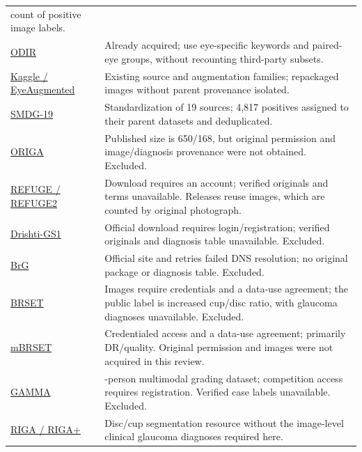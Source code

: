 \documentclass[
  10pt,
]{article}
\begin{document}
\begin{longtable}[]{@{}
  >{\raggedright\arraybackslash}p{}
  >{\raggedright\arraybackslash}p{}@{}}
count of positive image labels. \\
\href{https://www.kaggle.com/datasets/andrewmvd/ocular-disease-recognition-odir5k}{ODIR}
& Already acquired; use eye-specific keywords and paired-eye groups,
without recounting third-party subsets. \\
\href{https://github.com/yiweichen04/retina_dataset}{Kaggle /
EyeAugmented} & Existing source and augmentation families; repackaged
images without parent provenance isolated. \\
\href{https://github.com/TheBeastCoding/standardized-multichannel-dataset-glaucoma}{SMDG-19}
& Standardization of 19 sources; 4,817 positives assigned to their
parent datasets and deduplicated. \\
\href{https://www.kaggle.com/datasets/sshikamaru/glaucoma-detection}{ORIGA}
& Published size is 650/168, but original permission and image/diagnosis
provenance were not obtained. Excluded. \\
\href{https://refuge.grand-challenge.org/REFUGE2Download/}{REFUGE /
REFUGE2} & Download requires an account; verified originals and terms
unavailable. Releases reuse images, which are counted by original
photograph. \\
\href{https://cvit.iiit.ac.in/projects/mip/drishti-gs/mip-dataset2/Download.php}{Drishti-GS1}
& Official download requires login/registration; verified originals and
diagnosis table unavailable. Excluded. \\
\href{https://pmc.ncbi.nlm.nih.gov/articles/PMC9778370/}{BrG} & Official
site and retries failed DNS resolution; no original package or diagnosis
table. Excluded. \\
\href{https://physionet.org/content/brazilian-ophthalmological/1.0.2/}{BRSET}
& Images require credentials and a data-use agreement; the public label
is increased cup/disc ratio, with glaucoma diagnoses unavailable.
Excluded. \\
\href{https://physionet.org/content/mbrset/1.0/}{mBRSET} & Credentialed
access and a data-use agreement; primarily DR/quality. Original
permission and images were not acquired in this review. \\
\href{https://gamma.grand-challenge.org/}{GAMMA} & 300-person multimodal
grading dataset; competition access requires registration. Verified case
labels unavailable. Excluded. \\
\href{https://deepblue.lib.umich.edu/data/concern/data_sets/3b591905z}{RIGA
/ RIGA+} & Disc/cup segmentation resource without the image-level
clinical glaucoma diagnoses required here. \\

\end{longtable}
\end{document}
